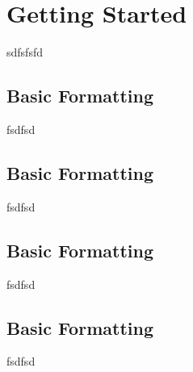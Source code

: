 





\chapter{Getting Started}\label{c1}

sdfsfsfd

\section{Basic Formatting}\label{c1basicformatting:sec}

fsdfsd

\section{Basic Formatting}\label{c1basicformatting:sec}

fsdfsd

\section{Basic Formatting}\label{c1basicformatting:sec}

fsdfsd
\section{Basic Formatting}\label{c1basicformatting:sec}

fsdfsd
